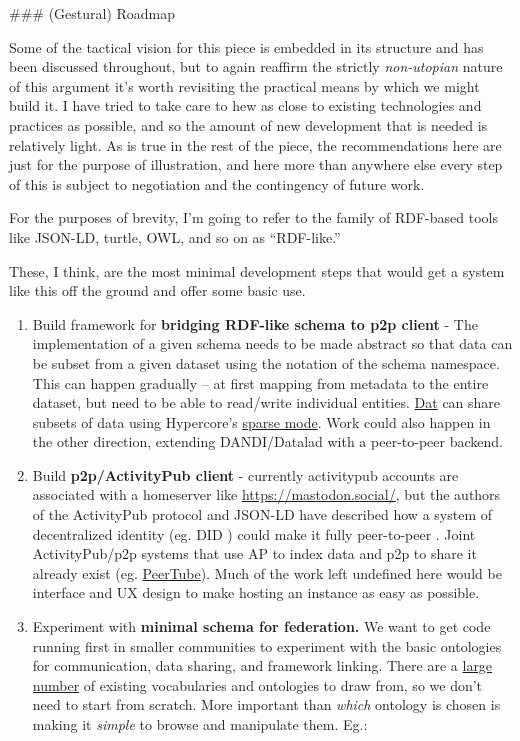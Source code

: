 \documentclass[10pt]{article}
\begin{document}
\begin{multicols}{2}
 \#\#\# (Gestural) Roadmap

Some of the tactical vision for this piece is embedded in its structure
and has been discussed throughout, but to again reaffirm the strictly
\emph{non-utopian} nature of this argument it's worth revisiting the
practical means by which we might build it. I have tried to take care to
hew as close to existing technologies and practices as possible, and so
the amount of new development that is needed is relatively light. As is
true in the rest of the piece, the recommendations here are just for the
purpose of illustration, and here more than anywhere else every step of
this is subject to negotiation and the contingency of future work.

For the purposes of brevity, I'm going to refer to the family of
RDF-based tools like JSON-LD, turtle, OWL, and so on as ``RDF-like.''

These, I think, are the most minimal development steps that would get a
system like this off the ground and offer some basic use.

\begin{enumerate}
\def\labelenumi{\arabic{enumi}.}

\item
  Build framework for \textbf{bridging RDF-like schema to p2p client} -
  The implementation of a given schema needs to be made abstract so that
  data can be subset from a given dataset using the notation of the
  schema namespace. This can happen gradually -- at first mapping from
  metadata to the entire dataset, but need to be able to read/write
  individual entities. \href{https://docs.dat.foundation/docs/faq}{Dat}
  can share subsets of data using Hypercore's
  \href{https://hypercore-protocol.org/guides/walkthroughs/creating-and-sharing-hypercores/}{sparse
  mode}. Work could also happen in the other direction, extending
  DANDI/Datalad with a peer-to-peer backend.
\item
  Build \textbf{p2p/ActivityPub client} - currently activitypub accounts
  are associated with a homeserver like \url{https://mastodon.social/},
  but the authors of the ActivityPub protocol and JSON-LD have described
  how a system of decentralized identity (eg. DID \cite{spornyDecentralizedIdentifiersDIDs2021} ) could make it fully
  peer-to-peer \cite{webberActivityPubDecentralizedDistributed2017} . Joint ActivityPub/p2p systems that use AP to index data and p2p
  to share it already exist (eg.
  \href{https://joinpeertube.org/\#what-is-peertube}{PeerTube}). Much of
  the work left undefined here would be interface and UX design to make
  hosting an instance as easy as possible.
\item
  Experiment with \textbf{minimal schema for federation.} We want to get
  code running first in smaller communities to experiment with the basic
  ontologies for communication, data sharing, and framework linking.
  There are a \href{https://lov.linkeddata.es/dataset/lov/vocabs}{large
  number} of existing vocabularies and ontologies to draw from, so we
  don't need to start from scratch. More important than \emph{which}
  ontology is chosen is making it \emph{simple} to browse and manipulate
  them. Eg.:


\end{enumerate}
\end{multicols}
\end{document}
